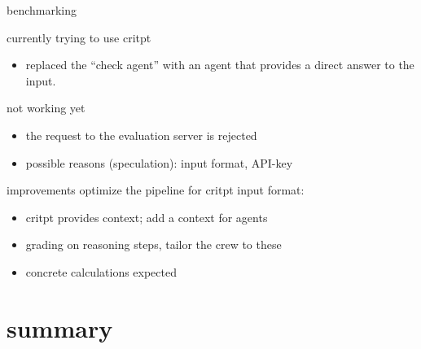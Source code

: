\documentclass[t,
10pt,
handout, %
]{beamer}
\numberwithin{equation}{section}
\begin{document}
\begin{frame}[c]{benchmarking}
\begin{minipage}{0.11 \linewidth}
		\end{minipage}
		\hfill
		\begin{minipage}{0.80\linewidth}
			currently trying to use critpt\autocite{critPtArx}
			\begin{itemize}
				\item replaced the \enquote {check agent} with an agent that provides a direct answer to the input.
			\end{itemize}\pause
			\begin{alertblock}{not working yet}
				\begin{itemize}
					\item the request to the evaluation server is rejected
					\item possible reasons (speculation): input format, API-key
				\end{itemize}
			\end{alertblock}
			\pause
			\begin{block}{improvements}
				optimize the pipeline for critpt input format: 
				\begin{itemize}
					\item critpt provides context; add a context for agents
					\item grading on reasoning steps, tailor the crew to these
					\item concrete calculations expected
				\end{itemize}
			\end{block}
		\end{minipage}
	\end{frame}
	
	\section{summary}
	
\end{document}
